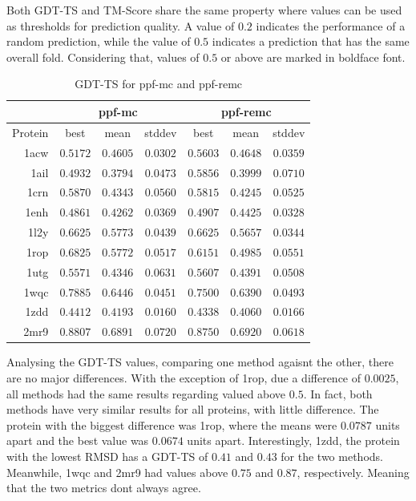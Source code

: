 Both GDT-TS and TM-Score share the same property where values can be used as
thresholds for prediction quality. A value of $0.2$ indicates the performance of
a random prediction, while the value of $0.5$ indicates a prediction that has
the same overall fold. Considering that, values of $0.5$ or above are marked
in boldface font.

\begin{table}
  \centering
  \begin{tabular}{r|c|c|c||c|c|c}
            & \multicolumn{3}{c}{ppf-mc} & \multicolumn{3}{||c}{ppf-remc} \\ \hline
    Protein & best          & mean          & stddev   & best          & mean          & stddev   \\ \hline \hline
    1acw    & $\bm{0.5172}$ & $0.4605$      & $0.0302$ & $\bm{0.5603}$ & $0.4648$      & $0.0359$ \\ \hline
    1ail    & $0.4932$      & $0.3794$      & $0.0473$ & $\bm{0.5856}$ & $0.3999$      & $0.0710$ \\ \hline
    1crn    & $\bm{0.5870}$ & $0.4343$      & $0.0560$ & $\bm{0.5815}$ & $0.4245$      & $0.0525$ \\ \hline
    1enh    & $0.4861$      & $0.4262$      & $0.0369$ & $0.4907$      & $0.4425$      & $0.0328$ \\ \hline
    1l2y    & $\bm{0.6625}$ & $\bm{0.5773}$ & $0.0439$ & $\bm{0.6625}$ & $\bm{0.5657}$ & $0.0344$ \\ \hline
    1rop    & $\bm{0.6825}$ & $\bm{0.5772}$ & $0.0517$ & $\bm{0.6151}$ & $0.4985$      & $0.0551$ \\ \hline
    1utg    & $\bm{0.5571}$ & $0.4346$      & $0.0631$ & $\bm{0.5607}$ & $0.4391$      & $0.0508$ \\ \hline
    1wqc    & $\bm{0.7885}$ & $\bm{0.6446}$ & $0.0451$ & $\bm{0.7500}$ & $\bm{0.6390}$ & $0.0493$ \\ \hline
    1zdd    & $0.4412$      & $0.4193$      & $0.0160$ & $0.4338$      & $0.4060$      & $0.0166$ \\ \hline
    2mr9    & $\bm{0.8807}$ & $\bm{0.6891}$ & $0.0720$ & $\bm{0.8750}$ & $\bm{0.6920}$ & $0.0618$ \\ \hline
  \end{tabular}
  \caption{GDT-TS for ppf-mc and ppf-remc}
  \label{tab:gdtts-data}
\end{table}

Analysing the GDT-TS values, comparing one method agaisnt the other, there are no
major differences. With the exception of 1rop, due a difference of $0.0025$, all
methods had the same results regarding valued above $0.5$. In fact, both methods
have very similar results for all proteins, with little difference. The protein
with the biggest difference was 1rop, where the means were $0.0787$ units apart
and the best value was $0.0674$ units apart. Interestingly, 1zdd, the protein
with the lowest RMSD has a GDT-TS of $0.41$ and $0.43$ for the two methods.
Meanwhile, 1wqc and 2mr9 had values above $0.75$ and $0.87$, respectively.
Meaning that the two metrics dont always agree.

